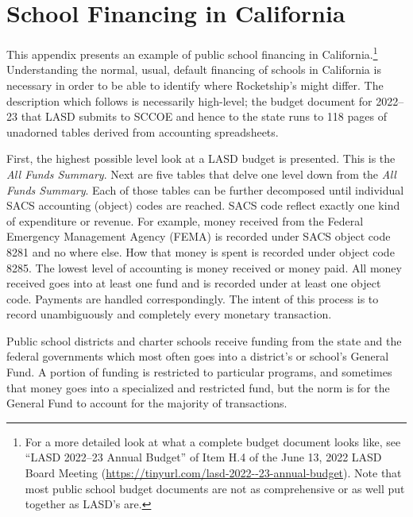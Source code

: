 
\chapter{School Financing in California}\label{appx:ca-school-financing}\indent%

This appendix presents an example of public school financing in California.\footnote{For a more detailed look at what a complete budget document looks like, see ``LASD 2022–23 Annual Budget'' of Item H.4 of the June 13, 2022 LASD Board Meeting (\url{https://tinyurl.com/lasd-2022--23-annual-budget}). Note that most public school budget documents are not as comprehensive or as well put together as LASD's are.} %
Understanding the normal, usual, default financing of schools in California is necessary in order to be able to identify where Rocketship's might differ. The description which follows is necessarily high-level; the budget document for 2022–23 that LASD submits to SCCOE and hence to the state runs to 118 pages of unadorned tables derived from accounting spreadsheets.

First, the highest possible level look at a LASD budget is presented. This is the \textit{All Funds Summary}. Next are five tables that delve one level down from the \textit{All Funds Summary}. Each of those tables can be further decomposed until individual SACS accounting (object) codes are reached. SACS code reflect exactly one kind of expenditure or revenue. For example, money received from the Federal Emergency Management Agency (FEMA) is recorded under SACS object code 8281 and no where else. How that money is spent is recorded under object code 8285. The lowest level of accounting is money received or money paid. All money received goes into at least one fund and is recorded under at least one object code. Payments are handled correspondingly. The intent of this process is to record unambiguously and completely every monetary transaction. 

Public school districts and charter schools receive funding from the state and the federal governments which most often goes into a district's or school's General Fund. A portion of funding is restricted to particular programs, and sometimes that money goes into a specialized and restricted fund, but the norm is for the General Fund to account for the majority of transactions.

